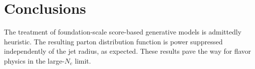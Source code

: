 \section{Conclusions}\label{sec:conclusions}

The treatment of foundation-scale score-based generative models is
admittedly heuristic. The resulting parton distribution function is
power suppressed independently of the jet radius, as expected. These
results pave the way for flavor physics in the large-$N_c$ limit.

